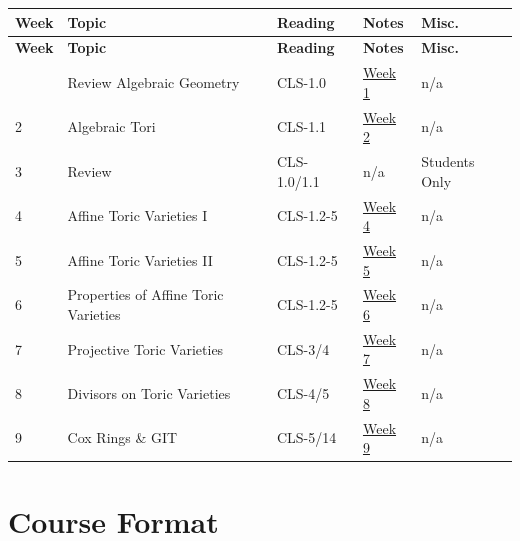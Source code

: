 \documentclass[11pt,letterpaper]{article}
\newcommand{\pageheading}[1]{\section*{#1}\addcontentsline{toc}{section}{#1}}
\begin{document}
\begingroup
\fontsize{9.5}{12.2}\selectfont
\setlength{\tabcolsep}{3pt}
\renewcommand{\arraystretch}{1.3}
\setlength{\LTpre}{3pt}\setlength{\LTpost}{8pt}
\begin{longtable}{L{30pt}L{218pt}L{78pt}L{62pt}L{74pt}}
\toprule[0.9pt]
\sffamily\bfseries\color{Forest} Week & \sffamily\bfseries\color{Forest} Topic & \sffamily\bfseries\color{Forest} Reading & \sffamily\bfseries\color{Forest} Notes & \sffamily\bfseries\color{Forest} Misc. \\
\midrule
\endfirsthead
\toprule[0.9pt]
\sffamily\bfseries\color{Forest} Week & \sffamily\bfseries\color{Forest} Topic & \sffamily\bfseries\color{Forest} Reading & \sffamily\bfseries\color{Forest} Notes & \sffamily\bfseries\color{Forest} Misc. \\
\midrule
\endhead
\bottomrule
{} & Review Algebraic Geometry & CLS-1.0 & \href{https://www.juliettebruce.xyz/teaching/125S26/Notes/Week1.pdf}{Week 1} & n/a \\
2 & Algebraic Tori & CLS-1.1 & \href{https://www.juliettebruce.xyz/teaching/125S26/Notes/Week2.pdf}{Week 2} & n/a \\
3 & Review & CLS-1.0/1.1 & n/a & Students Only \\
4 & Affine Toric Varieties I & CLS-1.2-5 & \href{https://www.juliettebruce.xyz/teaching/125S26/Notes/Week4.pdf}{Week 4} & n/a \\
5 & Affine Toric Varieties II & CLS-1.2-5 & \href{https://www.juliettebruce.xyz/teaching/125S26/Notes/Week5.pdf}{Week 5} & n/a \\
6 & Properties of Affine Toric Varieties & CLS-1.2-5 & \href{https://www.juliettebruce.xyz/teaching/125S26/Notes/Week6.pdf}{Week 6} & n/a \\
7 & Projective Toric Varieties & CLS-3/4 & \href{https://www.juliettebruce.xyz/teaching/125S26/Notes/Week7.pdf}{Week 7} & n/a \\
8 & Divisors on Toric Varieties & CLS-4/5 & \href{https://www.juliettebruce.xyz/teaching/125S26/Notes/Week8.pdf}{Week 8} & n/a \\
9 & Cox Rings \& GIT & CLS-5/14 & \href{https://www.juliettebruce.xyz/teaching/125S26/Notes/Week9.pdf}{Week 9} & n/a \\
\end{longtable}
\endgroup

\begingroup
\fontsize{10.2}{13.1}\selectfont
\setlength{\parskip}{3pt plus 1pt}
\titlespacing*{\subsection}{0pt}{8pt}{2pt}
\pageheading{Course Format}
\end{document}
